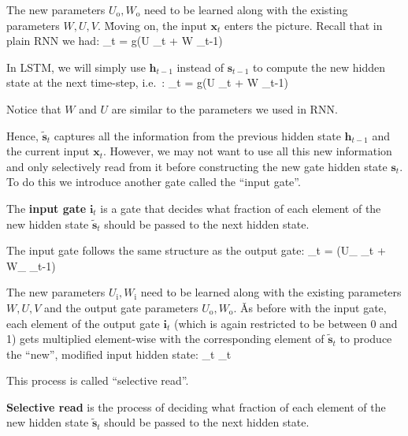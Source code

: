 The new parameters $U_{\text{o}}, W_{\text{o}}$ need to be learned along with the existing parameters $W, U, V$. \v

Moving on, the input $\boldsymbol{x}_{t}$ enters the picture. Recall that in plain RNN we had:
\bse
{}_{t} = g(U _t + W _{t-1})
\ese

In LSTM, we will simply use $\boldsymbol{h}_{t-1}$ instead of $\boldsymbol{s}_{t-1}$ to compute the new hidden state at the
next time-step, i.e.\ :
\bse
{}_t = g(U _t + W _{t-1})
\ese

Notice that $W$ and $U$ are similar to the parameters we used in RNN\@.


Hence, $\boldsymbol{\tilde{s}}_t$ captures all the information from the previous hidden state $\boldsymbol{h}_{t-1}$ and the
current input $\boldsymbol{x}_t $. However, we may not want to use all this new information and only selectively read
from it before constructing the new gate hidden state $\boldsymbol{s}_t$. To do this we introduce another gate called the
``input gate''.

The \textbf{input gate} $\boldsymbol{i}_{t}$ is a gate that decides what fraction of each element of the new hidden state
$\boldsymbol{\tilde{s}}_t$ should be passed to the next hidden state.
\ed

The input gate follows the same structure as the output gate:
\bse
{}_{t} = \sigma(U_{} _{t} + W_{} _{t-1})
\ese

The new parameters $U_{\text{i}}, W_{\text{i}}$ need to be learned along with the existing parameters
$W, U, V$ and the output gate parameters $U_{\text{o}}, W_{\text{o}}$. \v

As before with the input gate, each element of the output gate $\boldsymbol{i}_{t}$ (which is again restricted to be
between 0 and 1) gets multiplied element-wise with the corresponding element of $\boldsymbol{\tilde{s}}_t$ to produce
the ``new'', modified input hidden state:
\bse
{}_t \odot {}_{t}
\ese

This process is called ``selective read''.

\textbf{Selective read} is the process of deciding what fraction of each element of the new hidden state
$\boldsymbol{\tilde{s}}_t$ should be passed to the next hidden state.
\ed

